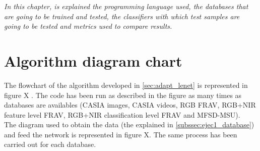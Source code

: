 
\begin{small}
\emph{In this chapter, is explained the programming language used, the databases that are going to be trained and tested, the classifiers with which test samples are going to be tested and metrics used to compare results.}
\end{small}





\section{Algorithm diagram chart}
The flowchart of the algorithm developed in \ref{sec:adapt_lenet} is represented in figure X . The code has been run as described in the figure as many times as databases are availables (CASIA images, CASIA videos, RGB FRAV, RGB+NIR feature level FRAV, RGB+NIR classification level FRAV and MFSD-MSU).\\

The diagram used to obtain the data (the explained in \ref{subssec:ejec1_database}) and feed the network is represented in figure X. The same process has been carried out for each database.\\

